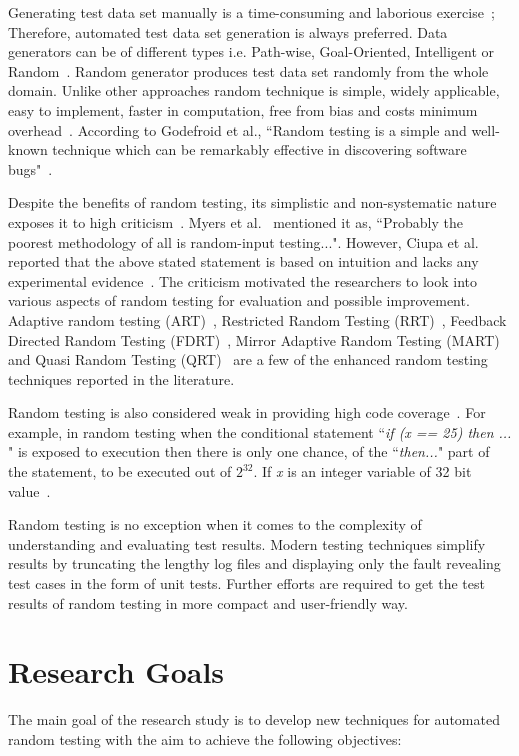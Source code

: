 Generating test data set manually is a time-consuming and laborious exercise~\cite{korel1990}; Therefore, automated test data set generation is always preferred. Data generators can be of different types i.e. Path-wise, Goal-Oriented, Intelligent or Random~\cite{wiki2013}. Random generator produces test data set randomly from the whole domain. Unlike other approaches random technique is simple, widely applicable, easy to implement, faster in computation, free from bias and costs minimum overhead~\cite{Ciupa2007}. According to Godefroid et al., ``Random testing is a simple and well-known technique which can be remarkably effective in discovering software bugs"~\cite{Godefroid2005}.

Despite the benefits of random testing, its simplistic and non-systematic nature exposes it to high criticism~\cite{white1987}. Myers et al.~\cite{Myers2011} mentioned it as, ``Probably the poorest methodology of all is random-input testing...". However, Ciupa et al. reported that the above stated statement is based on intuition and lacks any experimental evidence~\cite{Ciupa2008a}. The criticism motivated the researchers to look into various aspects of random testing for evaluation and possible improvement. Adaptive random testing (ART)~\cite{Chen2008}, Restricted Random Testing (RRT)~\cite{Chan2002}, Feedback Directed Random Testing (FDRT)~\cite{Pacheco2007a}, Mirror Adaptive Random Testing (MART)~\cite{Chen2003} and Quasi Random Testing (QRT)~\cite{Chen2005} are a few of the enhanced random testing techniques reported in the literature.

Random testing is also considered weak in providing high code coverage~\cite{cohen1997, Offutt1996}. For example, in random testing when the conditional statement  ``{\it if (x == 25) then ... }"  is exposed to execution then there is only one chance, of the ``{\it then...}" part of the statement, to be executed out of $2^\text{32}$. If {\it x} is an integer variable of 32 bit value~\cite{Godefroid2005}. 

Random testing is no exception when it comes to the complexity of understanding and evaluating test results. Modern testing techniques simplify results by truncating the lengthy log files and displaying only the fault revealing test cases in the form of unit tests. Further efforts are required to get the test results of random testing in more compact and user-friendly way. 


\section{Research Goals} \label{ResearchGoals}
The main goal of the research study is to develop new techniques for automated random testing with the aim to achieve the following objectives:

